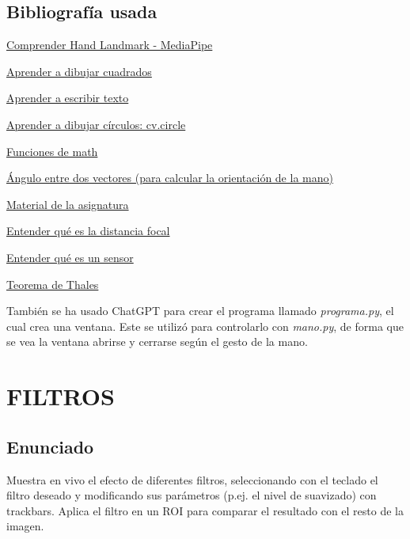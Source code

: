 \documentclass[12pt]{article}
\begin{document}
\subsection*{Bibliografía usada}
\href{https://github.com/google/mediapipe/blob/master/docs/solutions/hands.md}{Comprender Hand Landmark - MediaPipe}

\href{https://docs.opencv.org/3.4/d6/d6e/group__imgproc__draw.html#ga07d2f74cadcf8e305e810ce8eed13bc9}{Aprender a dibujar cuadrados}

\href{https://docs.opencv.org/3.4/d6/d6e/group__imgproc__draw.html#ga5126f47f883d730f633d74f07456c576}{Aprender a escribir texto}

\href{https://docs.opencv.org/3.4/d6/d6e/group__imgproc__draw.html#gaf10604b069374903dbd0f0488cb43670}{Aprender a dibujar círculos: cv.circle}

\href{https://docs.python.org/3/library/math.html}{Funciones de math}

\href{https://www.superprof.es/apuntes/escolar/matematicas/analitica/vectores/angulo-de-dos-vectores.html}{Ángulo entre dos vectores (para calcular la orientación de la mano)}

\href{https://github.com/albertoruiz/umucv/blob/master/notebooks/imagen.ipynb}{Material de la asignatura}

\href{https://www.sony.es/electronics/support/articles/00267921}{Entender qué es la distancia focal}

\href{https://www.blogdelfotografo.com/tipos-caracteristicas-ventajas-sensores-camaras-fotos/}{Entender qué es un sensor}

\href{https://www.superprof.es/apuntes/escolar/matematicas/geometria/basica/triangulos-en-posicion-de-thales.html}{Teorema de Thales}

También se ha usado ChatGPT para crear el programa llamado \textit{programa.py}, el cual crea una ventana. Este se utilizó para controlarlo con \textit{mano.py}, de forma que se vea la ventana abrirse y cerrarse según el gesto de la mano.

\newpage

\section{FILTROS}
\subsection*{Enunciado}

Muestra en vivo el efecto de diferentes filtros, seleccionando con el teclado el filtro deseado y modificando sus parámetros (p.ej. el nivel de suavizado) con trackbars. Aplica el filtro en un ROI para comparar el resultado con el resto de la imagen.
\end{document}
